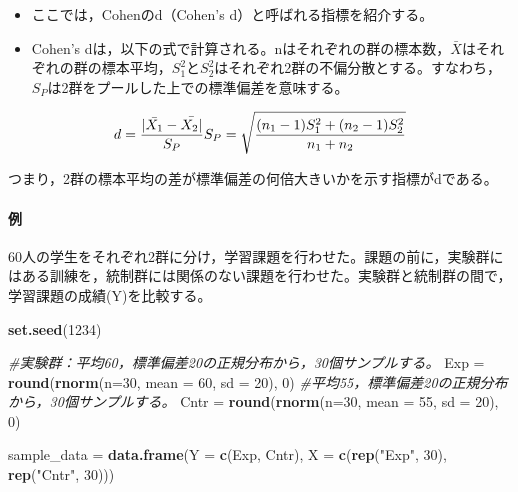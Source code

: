 \documentclass[]{article}
\newenvironment{Shaded}{\begin{snugshade}}{\end{snugshade}}
\newcommand{\KeywordTok}[1]{\textcolor[rgb]{0.13,0.29,0.53}{\textbf{#1}}}
\newcommand{\DataTypeTok}[1]{\textcolor[rgb]{0.13,0.29,0.53}{#1}}
\newcommand{\DecValTok}[1]{\textcolor[rgb]{0.00,0.00,0.81}{#1}}
\newcommand{\StringTok}[1]{\textcolor[rgb]{0.31,0.60,0.02}{#1}}
\newcommand{\CommentTok}[1]{\textcolor[rgb]{0.56,0.35,0.01}{\textit{#1}}}
\newcommand{\NormalTok}[1]{#1}
\let\oldparagraph\paragraph
\renewcommand{\paragraph}[1]{\oldparagraph{#1}\mbox{}}
\begin{document}
\begin{itemize}
\item
  ここでは，Cohenのd（Cohen's d）と呼ばれる指標を紹介する。
\item
  Cohen's
  dは，以下の式で計算される。nはそれぞれの群の標本数，\(\bar{X}\)はそれぞれの群の標本平均，\(S_{1}^2\)と\(S_{2}^2\)はそれぞれ2群の不偏分散とする。すなわち，\(S_{P}\)は2群をプールした上での標準偏差を意味する。
\end{itemize}

\[
d = \frac{|\bar{X_{1}} - \bar{X_{2}|}}{S_{P}} \\
S_{P} = \sqrt{\frac{(n_{1}-1)S_{1}^2 + (n_{2}-1)S_{2}^2}{n_{1}+n_{2}}}
\]

つまり，2群の標本平均の差が標準偏差の何倍大きいかを示す指標がdである。

\paragraph{例}

60人の学生をそれぞれ2群に分け，学習課題を行わせた。課題の前に，実験群にはある訓練を，統制群には関係のない課題を行わせた。実験群と統制群の間で，学習課題の成績(Y)を比較する。

\begin{Shaded}
\begin{Highlighting}[]
\KeywordTok{set.seed}\NormalTok{(}\DecValTok{1234}\NormalTok{)}

\CommentTok{#実験群：平均60，標準偏差20の正規分布から，30個サンプルする。}
\NormalTok{Exp =}\StringTok{ }\KeywordTok{round}\NormalTok{(}\KeywordTok{rnorm}\NormalTok{(}\DataTypeTok{n=}\DecValTok{30}\NormalTok{, }\DataTypeTok{mean =} \DecValTok{60}\NormalTok{, }\DataTypeTok{sd =} \DecValTok{20}\NormalTok{), }\DecValTok{0}\NormalTok{)}
\CommentTok{#平均55，標準偏差20の正規分布から，30個サンプルする。}
\NormalTok{Cntr =}\StringTok{ }\KeywordTok{round}\NormalTok{(}\KeywordTok{rnorm}\NormalTok{(}\DataTypeTok{n=}\DecValTok{30}\NormalTok{, }\DataTypeTok{mean =} \DecValTok{55}\NormalTok{, }\DataTypeTok{sd =} \DecValTok{20}\NormalTok{), }\DecValTok{0}\NormalTok{)}

\NormalTok{sample_data =}\StringTok{ }\KeywordTok{data.frame}\NormalTok{(}\DataTypeTok{Y =} \KeywordTok{c}\NormalTok{(Exp, Cntr), }\DataTypeTok{X =} \KeywordTok{c}\NormalTok{(}\KeywordTok{rep}\NormalTok{(}\StringTok{"Exp"}\NormalTok{, }\DecValTok{30}\NormalTok{), }\KeywordTok{rep}\NormalTok{(}\StringTok{"Cntr"}\NormalTok{, }\DecValTok{30}\NormalTok{)))}
\end{Highlighting}
\end{Shaded}
\end{document}

